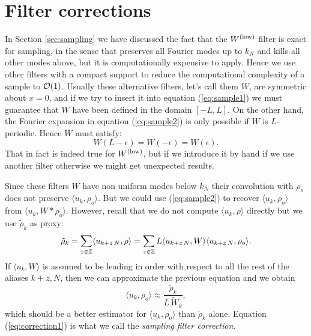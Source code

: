 \section{Filter corrections}
    
\noindent In Section \ref{sec:sampling} we have discussed the fact that the
$W^\mathrm{(low)}$ filter is exact for sampling, in the sense that preserves all Fourier
modes up to $k_N$ and kills all other modes above, but it is computationally
expensive to apply. Hence we use other filters with a compact support to reduce
the computational complexity of a sample to ${\cal O}(1)$.
Usually these alternative filters, let's call them $W$,
are symmetric about $x=0$,
and if we try to insert it into equation (\ref{eq:sample1}) 
we must guarantee that $W$ have been defined in the domain $[-L,L]$.
On the other hand, the Fourier
expansion in equation (\ref{eq:sample2}) is only possible if
$W$ is $L$-periodic. 
Hence $W$ must satisfy:
$$W(L-\epsilon)=W(-\epsilon) = W(\epsilon).$$
That in fact is indeed true for $W^\mathrm{(low)}$, but if we introduce
it by hand if we use another filter
otherwise we might get unexpected results.

Since these filters $W$ have non uniform modes below $k_N$
their convolution with $\rho_o$ does not preserve $\langle u_k, \rho_o
\rangle$. But we could use (\ref{eq:sample2}) to recover 
$\langle u_k, \rho_o \rangle$ from $\langle u_k, W * \rho_o \rangle$.
However, recall that we do not compute $\langle u_k, \rho \rangle$
directly but we use $\tilde \rho_k$ as proxy:
\begin{equation}
    \tilde \rho_k
    = \sum_{z\in\mathbb{Z}} 
        \langle u_{k + z\, N}, \rho \rangle
    = \sum_{z\in\mathbb{Z}} 
       L 
       \langle u_{k + z\, N}, W \rangle 
       \langle u_{k + z\, N}, \rho_o \rangle .
\end{equation}
If $\langle u_{k}, W \rangle $ is assumed to be leading
in order with respect to all the rest of the aliases $k+z,N$,
then we can approximate the previous equation and we obtain
\begin{equation}
    \langle u_{k}, \rho_o \rangle 
    \approx  
    \frac{  
        \tilde \rho_k %
    }{
        L\, %
       \tilde W_k
    },
    \label{eq:correction1}
\end{equation}
which should be a better estimator for 
    $\langle u_{k}, \rho_o \rangle $ than $\tilde \rho_k$ alone.
Equation (\ref{eq:correction1}) is what we call the \emph{sampling filter
correction}.



